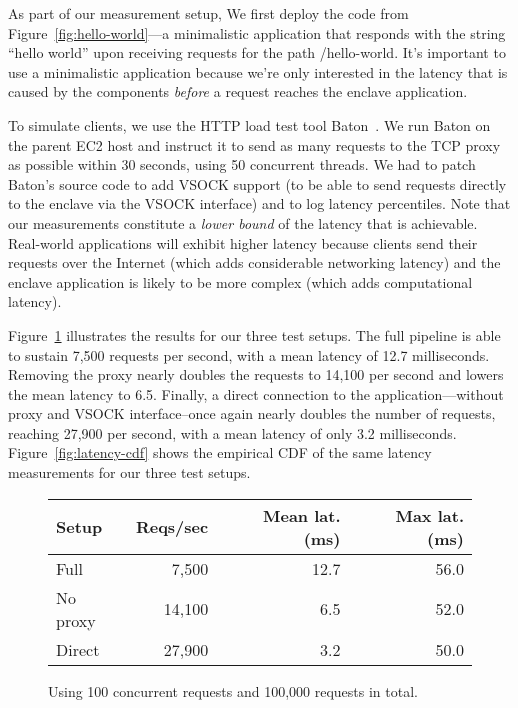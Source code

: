 As part of our measurement setup, We first deploy the code from
Figure~\ref{fig:hello-world}---a minimalistic application that responds with
the string ``hello world'' upon receiving requests for the path /hello-world.
It's important to use a minimalistic application because we're only interested
in the latency that is caused by the components \emph{before} a request reaches
the enclave application.

To simulate clients, we use the HTTP load test tool Baton~\cite{baton}.  We run
Baton on the parent EC2 host and instruct it to send as many requests to the
TCP proxy as possible within 30 seconds, using 50 concurrent threads.  We had to
patch Baton's source code to add VSOCK support (to be able to send requests
directly to the enclave via the VSOCK interface) and to log latency
percentiles.  Note that our measurements constitute a \emph{lower bound} of the
latency that is achievable.  Real-world applications will exhibit higher latency
because clients send their requests over the Internet (which adds considerable
networking latency) and the enclave application is likely to be more complex
(which adds computational latency).

Figure~\ref{fig:latency-msmts} illustrates the results for our three test
setups.  The full pipeline is able to sustain 7,500 requests per second, with a
mean latency of 12.7 milliseconds.  Removing the proxy nearly doubles the
requests to 14,100 per second and lowers the mean latency to 6.5.  Finally, a
direct connection to the application---without proxy and VSOCK interface--once
again nearly doubles the number of requests, reaching 27,900 per second, with a
mean latency of only 3.2 milliseconds.  Figure~\ref{fig:latency-cdf} shows the
empirical CDF of the same latency measurements for our three test setups.

\begin{figure}[t]
    \centering
    \begin{tabular}{l r r r}
    \toprule
      Setup & Reqs/sec & Mean lat. (ms) & Max lat. (ms) \\
    \midrule
    Full & 7,500 & 12.7 & 56.0 \\
    No proxy & 14,100 & 6.5 & 52.0 \\
    Direct & 27,900 & 3.2 & 50.0 \\
    \bottomrule
    \end{tabular}
    \caption{Using 100 concurrent requests and 100,000 requests in total.}
    \label{fig:latency-msmts}
\end{figure}


